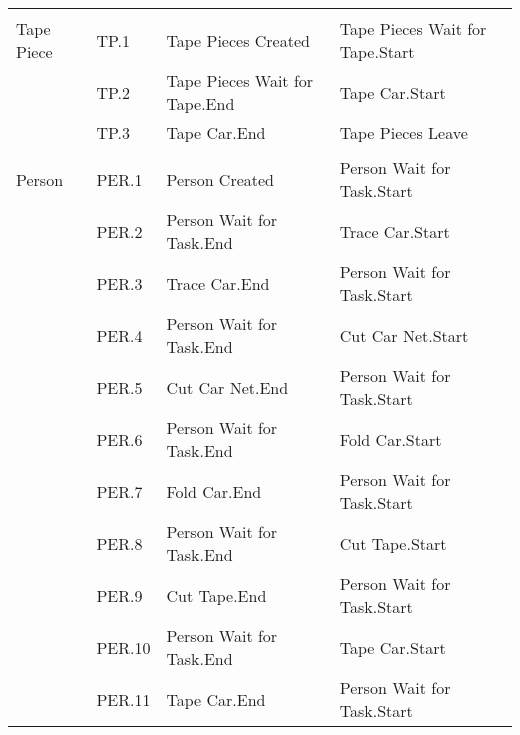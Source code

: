 \begin{tabular}{p{2.4cm}>{\raggedright\arraybackslash}p{1.2cm}>{\raggedright\arraybackslash}p{5.9cm}>{\raggedright\arraybackslash}p{5.9cm}}
       &      &              &              \\
Tape Piece & TP.1 & Tape Pieces Created & Tape Pieces Wait for Tape.Start \\
           & TP.2 & Tape Pieces Wait for Tape.End & Tape Car.Start \\
           & TP.3 & Tape Car.End & Tape Pieces Leave \\
     &      &              &              \\
Person & PER.1 & Person Created & Person Wait for Task.Start \\
       & PER.2 & Person Wait for Task.End & Trace Car.Start \\
       & PER.3 & Trace Car.End & Person Wait for Task.Start \\
       & PER.4 & Person Wait for Task.End & Cut Car Net.Start \\
       & PER.5 & Cut Car Net.End & Person Wait for Task.Start \\
       & PER.6 & Person Wait for Task.End & Fold Car.Start \\
       & PER.7 & Fold Car.End & Person Wait for Task.Start \\
       & PER.8 & Person Wait for Task.End & Cut Tape.Start \\
       & PER.9 & Cut Tape.End & Person Wait for Task.Start \\
       & PER.10 & Person Wait for Task.End & Tape Car.Start \\
       & PER.11 & Tape Car.End & Person Wait for Task.Start \\\bottomrule
\end{tabular}
